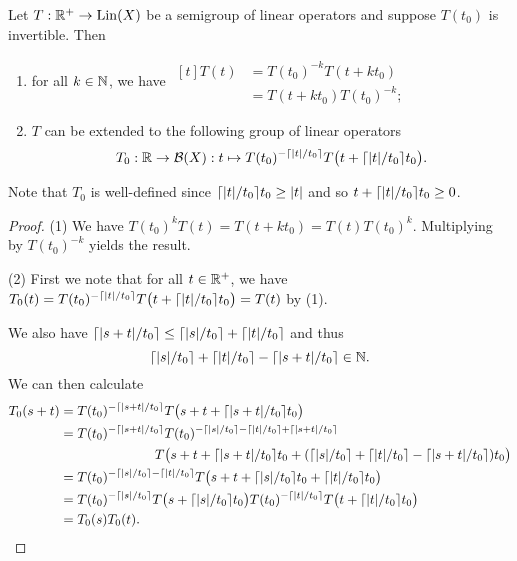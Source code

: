\begin{proposition} \label{extendingSemigroupToGroupOfLinearOperators}
Let $T:\mathbb{R}^+\to \operatorname{Lin}(X)$ be a semigroup of linear operators and suppose $T(t_0)$ is invertible. Then
\begin{enumerate}
\item for all $k\in \mathbb{N}$, we have $\begin{aligned}[t]
T(t) &= T(t_0)^{-k}T(t+kt_0) \\
&= T(t+kt_0)T(t_0)^{-k};
\end{aligned}$
\item $T$ can be extended to the following group of linear operators
\[ T_0: \mathbb{R}\to \operatorname{\mathcal{B}}(X): t \mapsto T(t_0)^{-\lceil|t|/t_0\rceil}T\big(t + \lceil|t|/t_0\rceil t_0\big). \]
\end{enumerate}
\end{proposition}
Note that $T_0$ is well-defined since $\lceil|t|/t_0\rceil t_0 \geq |t|$ and so $t + \lceil|t|/t_0\rceil t_0 \geq 0$.
\begin{proof}
(1) We have $T(t_0)^kT(t) = T(t+kt_0) = T(t)T(t_0)^k$. Multiplying by $T(t_0)^{-k}$ yields the result.

(2) First we note that for all $t\in \mathbb{R}^+$, we have $T_0(t) = T(t_0)^{-\lceil|t|/t_0\rceil}T\big(t + \lceil|t|/t_0\rceil t_0\big) = T(t)$ by (1).

We also have $\lceil|s+t|/t_0\rceil \leq \lceil|s|/t_0\rceil + \lceil|t|/t_0\rceil$ and thus
\[ \lceil|s|/t_0\rceil + \lceil|t|/t_0\rceil - \lceil|s+t|/t_0\rceil \in \mathbb{N}. \]
We can then calculate
\begin{align*}
T_0(s+t) &= T(t_0)^{-\lceil|s+t|/t_0\rceil}T\big(s+t+\lceil|s+t|/t_0\rceil t_0\big) \\
&= \begin{aligned}[t]T(t_0)^{-\lceil|s+t|/t_0\rceil}&T(t_0)^{-\lceil|s|/t_0\rceil - \lceil|t|/t_0\rceil + \lceil|s+t|/t_0\rceil} \\
T&\big(s+t+\lceil|s+t|/t_0\rceil t_0 + (\lceil|s|/t_0\rceil + \lceil|t|/t_0\rceil - \lceil|s+t|/t_0\rceil)t_0\big)\end{aligned} \\
&= T(t_0)^{-\lceil|s|/t_0\rceil - \lceil|t|/t_0\rceil}T\big(s+t+\lceil|s|/t_0\rceil t_0 + \lceil|t|/t_0\rceil t_0\big) \\
&= T(t_0)^{-\lceil|s|/t_0\rceil}T\big(s+\lceil|s|/t_0\rceil t_0\big)T(t_0)^{ - \lceil|t|/t_0\rceil}T\big(t+ \lceil|t|/t_0\rceil t_0\big) \\
&=T_0(s)T_0(t).
\end{align*}
\end{proof}

